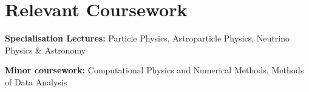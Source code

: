 \documentclass[letterpaper,11pt]{article}
\begin{document}

\section{Relevant Coursework}
  \vspace{2pt}
  \resumeSubHeadingListStart
    \small{\item{
        \textbf{Specialisation Lectures:}{ Particle Physics, Astroparticle Physics, Neutrino Physics \& Astronomy} \\ \vspace{3pt}
        
        \textbf{Minor coursework:}{ Computational Physics and Numerical Methods, Methods of Data Analysis}
    }}
  \resumeSubHeadingListEnd



\end{document}
